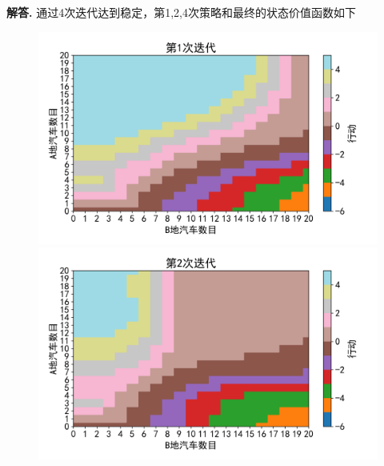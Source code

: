 \documentclass[12pt, a4paper, oneside]{ctexart}
\newenvironment{solution}[1][]{\par\noindent\textbf{#1解答. }}{\smallskip\par}  %
\begin{document}
\begin{solution}
    通过4次迭代达到稳定，第1,2,4次策略和最终的状态价值函数如下
    \begin{figure}[htbp]
        \hspace{-2.2cm}
        \subfigure  %
        {
            \begin{minipage}[b]{.6\linewidth}
                \centering
                \includegraphics[scale=0.52]{080/080页练习4.7policy1.png}
            \end{minipage}
        }
        \subfigure
        {
            \begin{minipage}[b]{.2\linewidth}
                \centering
                \includegraphics[scale=0.52]{080/080页练习4.7policy2.png}
            \end{minipage}
        }
    \end{figure}
    \clearpage
    \begin{figure}[htbp]
        \hspace{-0.5cm}

\end{figure}
\end{solution}
\end{document}
